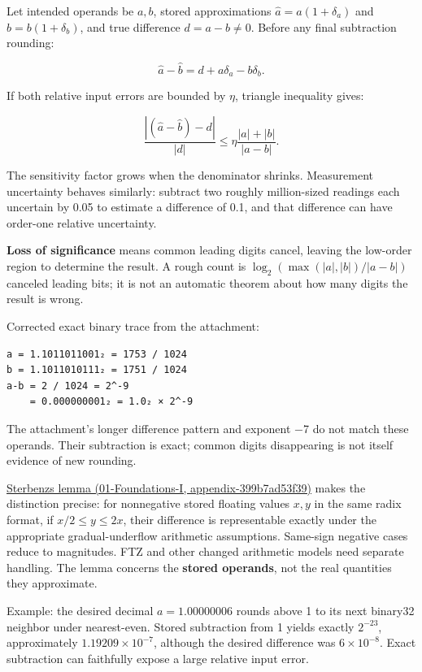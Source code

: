 Let intended operands be \(a,b\), stored approximations \(\widehat a=a(1+\delta_a)\) and \(\widehat b=b(1+\delta_b)\), and true difference \(d=a-b\ne0\). Before any final subtraction rounding:

\[
\widehat a-\widehat b=d+a\delta_a-b\delta_b.
\]

If both relative input errors are bounded by \(\eta\), triangle inequality gives:

\[
\frac{|(\widehat a-\widehat b)-d|}{|d|}
\le\eta\frac{|a|+|b|}{|a-b|}.
\]

The sensitivity factor grows when the denominator shrinks. Measurement uncertainty behaves similarly: subtract two roughly million-sized readings each uncertain by 0.05 to estimate a difference of 0.1, and that difference can have order-one relative uncertainty.

\textbf{Loss of significance} means common leading digits cancel, leaving the low-order region to determine the result. A rough count is \(\log_2(\max(|a|,|b|)/|a-b|)\) canceled leading bits; it is not an automatic theorem about how many digits the result is wrong.

Corrected exact binary trace from the attachment:

\begin{verbatim}
a = 1.1011011001₂ = 1753 / 1024
b = 1.1011010111₂ = 1751 / 1024
a-b = 2 / 1024 = 2^-9
    = 0.000000001₂ = 1.0₂ × 2^-9
\end{verbatim}

The attachment's longer difference pattern and exponent −7 do not match these operands. Their subtraction is exact; common digits disappearing is not itself evidence of new rounding.

\href{../01-Foundations-I/main.pdf\#nameddest=appendix-399b7ad53f39}{Sterbenz\textquotesingle s lemma (01-Foundations-I, appendix-399b7ad53f39)} makes the distinction precise: for nonnegative stored floating values \(x,y\) in the same radix format, if \(x/2\le y\le2x\), their difference is representable exactly under the appropriate gradual-underflow arithmetic assumptions. Same-sign negative cases reduce to magnitudes. FTZ and other changed arithmetic models need separate handling. The lemma concerns the \textbf{stored operands}, not the real quantities they approximate.

Example: the desired decimal \(a=1.00000006\) rounds above 1 to its next binary32 neighbor under nearest-even. Stored subtraction from 1 yields exactly \(2^{-23}\), approximately \(1.19209\times10^{-7}\), although the desired difference was \(6\times10^{-8}\). Exact subtraction can faithfully expose a large relative input error.

